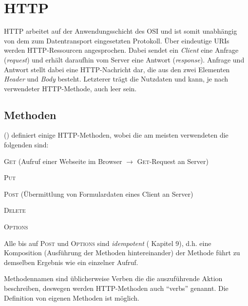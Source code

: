 \section{HTTP}
\label{sec:http}


\gls{HTTP} arbeitet auf der Anwendungsschicht des \gls{OSI} und ist somit unabhängig von dem zum Datentransport eingesetzten Protokoll. Über eindeutige \glspl{URI} werden \gls{HTTP}-Ressourcen angesprochen. Dabei sendet ein \emph{Client} eine Anfrage (\emph{request}) und erhält daraufhin vom Server eine Antwort (\emph{response}). Anfrage und Antwort stellt dabei eine \gls{HTTP}-Nachricht dar, die aus den zwei Elementen \emph{Header} und \emph{Body} besteht. Letzterer trägt die Nutzdaten und kann, je nach verwendeter \gls{HTTP}-Methode, auch leer sein.

\subsection{Methoden}
\label{sec:http_methods}

 (\cite{rfc2616}) definiert einige \gls{HTTP}-Methoden, wobei die am meisten verwendeten die folgenden sind:
\begin{compactitem}
    \item \textsc{Get} (Aufruf einer Webseite im Browser $\rightarrow$ \textsc{Get}-Request an Server)
    \item \textsc{Put}
    \item \textsc{Post} (Übermittlung von Formulardaten eines Client an Server)
    \item \textsc{Delete}
    \item \textsc{Options}
\end{compactitem}

Alle bis auf \textsc{Post} und \textsc{Options} sind \emph{idempotent} (\cite{rfc2616} Kapitel 9), d.h. eine Komposition (Ausführung der Methoden hintereinander) der Methode führt zu demselben Ergebnis wie ein einzelner Aufruf.

Methodennamen sind üblicherweise Verben die die auszuführende Aktion beschreiben, deswegen werden HTTP-Methoden auch \enquote{verbs} genannt. Die Definition von eigenen Methoden ist möglich.

